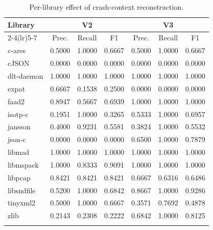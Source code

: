 \documentclass[pdflatex,sn-basic]{sn-jnl}%
\renewcommand{\arraystretch}{1.16}%
\theoremstyle{thmstyleone}%
\theoremstyle{thmstyletwo}%
\theoremstyle{thmstylethree}%
\begin{document}
\begin{table}[!htbp]
\caption{Per-library effect of crash-context reconstruction.}
\label{tab:per-library-context-reconstruction}
\centering
\scriptsize
\setlength{\tabcolsep}{2.2pt}
\renewcommand{\arraystretch}{1.08}
\begin{tabular*}{\linewidth}{@{\extracolsep{\fill}}lcccccc}
\toprule
Library & \multicolumn{3}{c}{V2} & \multicolumn{3}{c}{V3} \\
\cmidrule(lr){2-4}\cmidrule(lr){5-7}
& Prec. & Recall & F1 & Prec. & Recall & F1 \\
\midrule
c-ares & {\color{blue}0.5000} & {\color{blue}1.0000} & {\color{blue}0.6667} & {\color{blue}0.5000} & {\color{blue}1.0000} & {\color{blue}0.6667} \\
cJSON & 0.0000 & 0.0000 & 0.0000 & 0.0000 & 0.0000 & 0.0000 \\
dlt-daemon & {\color{blue}1.0000} & {\color{blue}1.0000} & {\color{blue}1.0000} & {\color{blue}1.0000} & {\color{blue}1.0000} & {\color{blue}1.0000} \\
expat & {\color{blue}0.6667} & {\color{blue}0.1538} & {\color{blue}0.2500} & {\color{blue}0.0000} & {\color{blue}0.0000} & {\color{blue}0.0000} \\
faad2 & {\color{blue}0.8947} & {\color{blue}0.5667} & {\color{blue}0.6939} & {\color{blue}1.0000} & {\color{blue}1.0000} & {\color{blue}1.0000} \\
isotp-c & {\color{blue}0.1951} & {\color{blue}1.0000} & {\color{blue}0.3265} & {\color{blue}0.5333} & {\color{blue}1.0000} & {\color{blue}0.6957} \\
jansson & {\color{blue}0.4000} & {\color{blue}0.9231} & {\color{blue}0.5581} & {\color{blue}0.3824} & {\color{blue}1.0000} & {\color{blue}0.5532} \\
json-c & 0.0000 & 0.0000 & 0.0000 & {\color{blue}0.6500} & {\color{blue}1.0000} & {\color{blue}0.7879} \\
libmad & 1.0000 & 1.0000 & 1.0000 & 1.0000 & 1.0000 & 1.0000 \\
libmspack & 1.0000 & {\color{blue}0.8333} & {\color{blue}0.9091} & 1.0000 & 1.0000 & 1.0000 \\
libpcap & {\color{blue}0.8421} & {\color{blue}0.8421} & {\color{blue}0.8421} & {\color{blue}0.6667} & {\color{blue}0.6316} & {\color{blue}0.6486} \\
libsndfile & {\color{blue}0.5200} & {\color{blue}1.0000} & {\color{blue}0.6842} & {\color{blue}0.8667} & {\color{blue}1.0000} & {\color{blue}0.9286} \\
tinyxml2 & {\color{blue}0.5000} & {\color{blue}1.0000} & {\color{blue}0.6667} & {\color{blue}0.3571} & {\color{blue}0.7692} & {\color{blue}0.4878} \\
zlib & {\color{blue}0.2143} & {\color{blue}0.2308} & {\color{blue}0.2222} & {\color{blue}0.6842} & {\color{blue}1.0000} & {\color{blue}0.8125} \\
\botrule
\end{tabular*}
\end{table}
\end{document}
